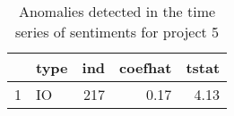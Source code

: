 % 
\begin{table}
\centering
\caption{Anomalies detected in the time series of sentiments for project 5}
\begin{tabular}{rlrrr}
  \hline
 & type & ind & coefhat & tstat \\ 
  \hline
1 & IO & 217 & 0.17 & 4.13 \\ 
   \hline
\end{tabular}
\end{table}